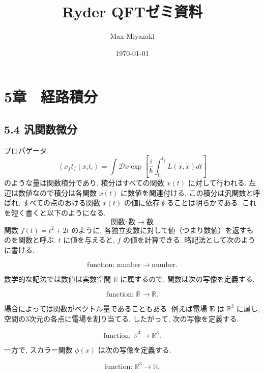 \documentclass{jsarticle}
\title{Ryder QFTゼミ資料}
\date{\today}
\author{Max Miyazaki}
\newcommand{\braket}[2]{\left\langle #1\middle|#2\right\rangle}
\begin{document}
\maketitle
\section*{\textrm{5章　経路積分}}
\subsection*{\textrm{5.4 汎関数微分}}
プロパゲータ
\begin{equation*}
    \braket{x_f t_f}{x_i t_i} = \int \mathcal{D}x \exp\left[ \frac{i}{\hbar}\int_{t_i}^{t_f} L(x, \dot{x})dt \right]
\end{equation*}
のような量は関数積分であり, 積分はすべての関数 $x(t)$ に対して行われる. 左辺は数値なので積分は各関数 $x(t)$ に数値を関連付ける. この積分は汎関数と呼ばれ, すべての点のおける関数 $x(t)$ の値に依存することは明らかである. これを短く書くと以下のようになる.
\begin{equation*}
    \textrm{関数} : \textrm{数} \rightarrow \textrm{数}\tag{5.50}
\end{equation*}
関数 $ f(t) = t^2 + 2t $ のように, 各独立変数に対して値（つまり数値）を返すものを関数と呼ぶ. $ t $ に値を与えると, $ f $ の値を計算できる. 略記法として次のように書ける.

\begin{equation*}
\text{function: number} \rightarrow \text{number}. \tag{5.51}
\end{equation*}

数学的な記法では数値は実数空間 $ \mathbb{R} $ に属するので, 関数は次の写像を定義する.

\begin{equation*}
\text{function: } \mathbb{R} \rightarrow \mathbb{R}. \tag{5.52}
\end{equation*}

場合によっては関数がベクトル量であることもある. 例えば電場 $ \mathbf{E} $ は $ \mathbb{R}^3 $ に属し, 空間の3次元の各点に電場を割り当てる. したがって, 次の写像を定義する.

\begin{equation*}
\text{function: } \mathbb{R}^3 \rightarrow \mathbb{R}^3. 
\end{equation*}

一方で, スカラー関数 $ \phi(x) $ は次の写像を定義する.

\begin{equation*}
\text{function: } \mathbb{R}^3 \rightarrow \mathbb{R}.
\end{equation*}
\end{document}
